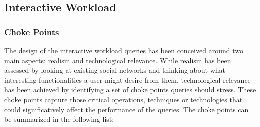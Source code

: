 \subsection{Interactive Workload}
\subsubsection{Choke Points}

The design of the interactive workload queries has been conceived around two
main aspects: realism and technological relevance.  While realism has been
assessed by looking at existing social networks and thinking about what
interesting functionalities a user might desire from them, technological
relevance has been achieved by identifying a set of choke points queries should
stress.  These choke points capture those critical operations, techniques or
technologies that  could significatively affect the performance of the queries.
The choke points can be summarized in the following list:

